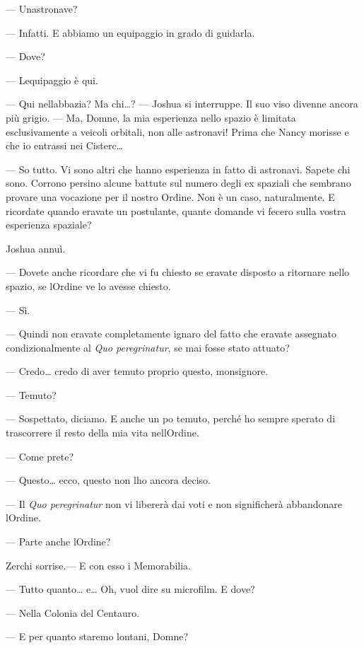 --- Un\textquotesingle astronave?

--- Infatti. E abbiamo un equipaggio in grado di guidarla.

--- Dove?

--- L\textquotesingle equipaggio è qui.

--- Qui nell\textquotesingle abbazia? Ma chi\ldots? --- Joshua si
interruppe. Il suo viso divenne ancora più grigio. --- Ma, Domne, la mia
esperienza nello spazio è limitata esclusivamente a veicoli orbitali,
non alle astronavi! Prima che Nancy morisse e che io entrassi nei
Cisterc\ldots{}

--- So tutto. Vi sono altri che hanno esperienza in fatto di astronavi.
Sapete chi sono. Corrono persino alcune battute sul numero degli ex
spaziali che sembrano provare una vocazione per il nostro Ordine. Non è
un caso, naturalmente. E ricordate quando eravate un postulante, quante
domande vi fecero sulla vostra esperienza spaziale?

Joshua annuì.

--- Dovete anche ricordare che vi fu chiesto se eravate disposto a
ritornare nello spazio, se l\textquotesingle Ordine ve lo avesse
chiesto.

--- Sì.

--- Quindi non eravate completamente ignaro del fatto che eravate
assegnato condizionalmente al \emph{Quo peregrinatur}, se mai fosse
stato attuato?

--- Credo\ldots{} credo di aver temuto proprio questo, monsignore.

--- Temuto?

--- Sospettato, diciamo. E anche un po\textquotesingle{} temuto, perché
ho sempre sperato di trascorrere il resto della mia vita
nell\textquotesingle Ordine.

--- Come prete?

--- Questo\ldots{} ecco, questo non l\textquotesingle ho ancora deciso.

--- Il \emph{Quo peregrinatur} non vi libererà dai voti e non
significherà abbandonare l\textquotesingle Ordine.

--- Parte anche l\textquotesingle Ordine?

Zerchi sorrise.--- E con esso i Memorabilia.

--- Tutto quanto\ldots{} e\ldots{} Oh, vuol dire su microfilm. E dove?

--- Nella Colonia del Centauro.

--- E per quanto staremo lontani, Domne?


